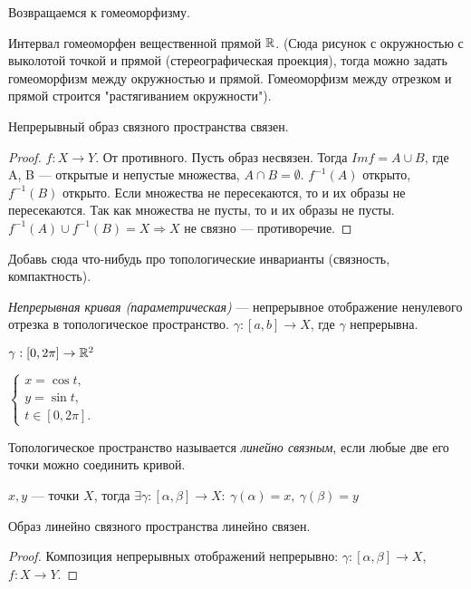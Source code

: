 Возвращаемся к гомеоморфизму.
\begin{example}
    Интервал гомеоморфен вещественной прямой $\mathbb{R}$. (Сюда рисунок с окружностью с выколотой точкой и прямой (стереографическая проекция), тогда можно задать гомеоморфизм между окружностью и прямой. Гомеоморфизм между отрезком и прямой строится "растягиванием окружности").
\end{example}

\begin{statement}
    Непрерывный образ связного пространства связен.
\end{statement}
\begin{proof}
    $f: X \to Y$. От противного. Пусть образ несвязен. Тогда $Im f = A \cup B$, где A, B — открытые и непустые множества, $A \cap B = \emptyset$. $f^{-1}(A)$ открыто, $f^{-1}(B)$ открыто. Если множества не пересекаются, то и их образы не пересекаются. Так как множества не пусты, то и их образы не пусты. $f^{-1}(A) \cup f^{-1}(B) = X \Rightarrow X$ не связно — противоречие. 
\end{proof}

Добавь сюда что-нибудь про топологические инварианты (связность, компактность).

\begin{definition}
    \textit{Непрерывная кривая (параметрическая)} — непрерывное отображение ненулевого отрезка в топологическое пространство. $\gamma: [a,b] \to X$, где $\gamma$ непрерывна.
\end{definition}

$\gamma: [0, 2 \pi] \to \mathbb{R}^{2}$

$\begin{cases}
    x = \cos{t}, \\
    y = \sin{t}, \\
    t \in [0, 2 \pi].
\end{cases}$

\begin{definition}
    Топологическое пространство называется \textit{линейно связным}, если любые две его точки можно соединить кривой.
\end{definition}

$x, y$ — точки $X$, тогда $\exists \gamma: [\alpha, \beta] \to X: \ \gamma(\alpha) = x, \ \gamma(\beta) = y$

\begin{statement}
    Образ линейно связного пространства линейно связен.
\end{statement}
\begin{proof}
    Композиция непрерывных отображений непрерывно:
    $\gamma: [\alpha, \beta] \to X$, $f: X \to Y$.
\end{proof}

